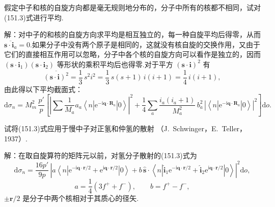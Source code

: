 \begin{xiti}

\quad 假定中子和核的自旋方向都是毫无规则地分布的，分子中所有的核都不相同，试对(151.3)式进行平均.

解：对中子的和核的自旋方向求平均是相互独立的，每一种自旋平均后得零，从而 $\overline{\boldsymbol{s}\cdot\boldsymbol{i}_a}=0$.如果分子中没有两个原子是相同的，这就没有核自旋的交换作用，又由于它们的直接相互作用可以忽略，分子中各个核的自旋方向可以看作是独立的，因而
$(\boldsymbol{s}\cdot\boldsymbol{i}_1)(\boldsymbol{s}\cdot\boldsymbol{i}_2)$
等形状的乘积平均后也得零.对于平方 $(\boldsymbol{s}\cdot\boldsymbol{i})^2$ 有
\begin{equation*}
  \overline{(\boldsymbol{s}\cdot\boldsymbol{i})^2}=\frac{1}{3}\,s^2i^2
  =\frac{1}{3}\,s(s+1)\,i(i+1)=\frac{1}{4}\,i(i+1),
\end{equation*}
由此得以下平均截面式：
\begin{equation*}
  \mathrm{d}\sigma_n=M_m^2\,\frac{p'}{p}\left[
  \left|\sum\frac{1}{M_a}a_a
  \left\langle n\left|\mathrm{e}^{-\mathrm{i}\boldsymbol{q}\cdot\boldsymbol{R}_a}\right|0\right\rangle\right|^2
  +\frac{1}{4}\sum_a\frac{i_a(i_a+1)}{M_a^2}\,b_a^2\,
  \left|\left\langle n\left|\mathrm{e}^{-\mathrm{i}\boldsymbol{q}\cdot\boldsymbol{R}_a}\right|0\right\rangle\right|^2
  \right]\mathrm{d}o.
\end{equation*}

\quad 试将(151.3)式应用于慢中子对正氢和仲氢的散射
（J.~Schwinger，E.~Teller，1937）.

解：在取自旋算符的矩阵元以前，对氢分子散射的(151.3)式为
\setcounter{equation}{0}\renewcommand{\theequation}{\arabic{equation}}%
\begin{equation}
  \mathrm{d}\sigma_n=\frac{16p'}{9p}\,
  \left|a\left\langle n\left|\mathrm{e}^{-\mathrm{i}\boldsymbol{q}\cdot\boldsymbol{r}/2}
  +\mathrm{e}^{\mathrm{i}\boldsymbol{q}\cdot\boldsymbol{r}/2}\right|0\right\rangle
  +b\,\hat{\boldsymbol{s}}\cdot\left\langle n\left|\hat{\boldsymbol{i}}_1
  \mathrm{e}^{-\mathrm{i}\boldsymbol{q}\cdot\boldsymbol{r}/2}
  +\hat{\boldsymbol{i}}_2\mathrm{e}^{\mathrm{i}\boldsymbol{q}\cdot\boldsymbol{r}/2}\right|0\right\rangle
  \right|^2\mathrm{d}o,
\end{equation}
\begin{equation*}
  a=\frac{1}{4}\left(3f^{+}+f^{-}\right),\qquad b=f^{+}-f^{-},
\end{equation*}
$\pm\boldsymbol{r}/2$ 是分子中两个核相对于其质心的径矢.


\end{xiti}
